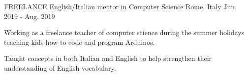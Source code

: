 \begin{cventries}
  \cventry
    {FREELANCE} %
    {English/Italian mentor in Computer Science} %
    {Rome, Italy} %
    {Jun. 2019 - Aug. 2019} %
    {
      \begin{cvitems} %
        \item {Working as a freelance teacher of computer science during the summer holidays teaching kids how to code and program Arduinos.}
        \item {Taught concepts in both Italian and English to help strengthen their understanding of English vocabulary.}
      \end{cvitems}
    }

\end{cventries}
